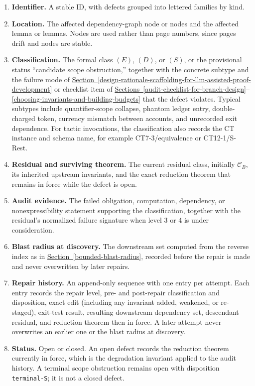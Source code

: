 \documentclass[
  11pt,
]{article}
\providecommand{\tightlist}{%
  \setlength{\itemsep}{0pt}\setlength{\parskip}{0pt}}
\theoremstyle{definition}
\newcommand{\secref}[1]{\hyperref[#1]{Section~\ref*{#1}}}
\newcommand{\secrange}[2]{\hyperref[#1]{Sections~\ref*{#1}}--\hyperref[#2]{\ref*{#2}}}
\begin{document}
\begin{enumerate}
\def\labelenumi{\arabic{enumi}.}
\tightlist
\item
  \textbf{Identifier.} A stable ID, with defects grouped into lettered
  families by kind.
\item
  \textbf{Location.} The affected dependency-graph node or nodes and the
  affected lemma or lemmas. Nodes are used rather than page numbers,
  since pages drift and nodes are stable.
\item
  \textbf{Classification.} The formal class \((E)\), \((D)\), or
  \((S)\), or the provisional status ``candidate scope obstruction,''
  together with the concrete subtype and
  the failure mode of
  \secref{design-rationale-scaffolding-for-llm-assisted-proof-development}
  or checklist item of
  \secrange{audit-checklist-for-branch-design}{choosing-invariants-and-building-budgets}
  that the defect violates. Typical subtypes include quantifier-scope
  collapse, phantom ledger entry, double-charged token, currency mismatch
  between accounts, and unrecorded exit dependence. For tactic
  invocations, the classification also records the CT instance and
  schema name, for example CT7-3/equivalence or CT12-1/S-Rest.
\item
  \textbf{Residual and surviving theorem.} The current residual class,
  initially \(\mathcal C_B\), its inherited upstream invariants, and the
  exact reduction theorem that remains in force while the defect is open.
\item
  \textbf{Audit evidence.} The failed obligation, computation,
  dependency, or nonexpressibility statement supporting the
  classification, together with the residual's normalized failure
  signature when level 3 or 4 is under consideration.
\item
  \textbf{Blast radius at discovery.} The downstream set computed from
  the reverse index as in \secref{bounded-blast-radius}, recorded before the repair is
  made and never overwritten by later repairs.
\item
  \textbf{Repair history.} An append-only sequence with one entry per
  attempt. Each entry records the repair level, pre- and post-repair
  classification and disposition, exact edit (including any invariant
  added, weakened, or re-staged), exit-test result, resulting downstream
  dependency set, descendant residual, and reduction theorem then in
  force. A later attempt never overwrites an earlier one or the blast
  radius at discovery.
\item
  \textbf{Status.} Open or closed. An open defect records the reduction
  theorem currently in force, which is the degradation invariant applied
  to the audit history. A terminal scope obstruction remains open with
  disposition \texttt{terminal-S}; it is not a closed defect.
\end{enumerate}
\end{document}
